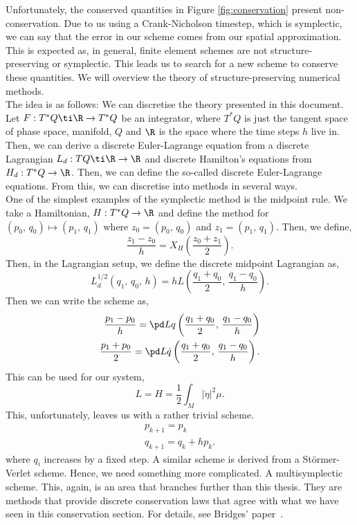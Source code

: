 \newpage
\noindent
Unfortunately, the conserved quantities in Figure \ref{fig:conservation} present non-conservation. Due to us using a Crank-Nicholson timestep, which is symplectic, we can say that the error in our scheme comes from our spatial approximation. This is expected as, in general, finite element schemes are not structure-preserving or symplectic. This leads us to search for a new scheme to conserve these quantities. We will overview the theory of structure-preserving numerical methods. \\

\noindent
The idea is as follows: We can discretise the theory presented in this document. Let $F : T^*Q \ti \R \to T^*Q$ be an integrator, where $T^*Q$ is just the tangent space of phase space, manifold, $Q$ and $\R$ is the space where the time steps $h$ live in. Then, we can derive a discrete Euler-Lagrange equation from a discrete Lagrangian $L_d : TQ \ti \R \to \R$ and discrete Hamilton's equations from $H_d : T^*Q\to \R$. Then, we can define the so-called discrete Euler-Lagrange equations. From this, we can discretise into methods in several ways.\\

\noindent
One of the simplest examples of the symplectic method is the midpoint rule. We take a Hamiltonian, $H : T^*Q \to \R$ and define the method for $(p_0,\,q_0) \mapsto (p_1,\,q_1)$ where $z_0 = (p_0,\,q_0)$ and $z_1 = (p_1,\,q_1)$. Then, we define,
$$ \frac{z_1-z_0}{h} = X_H \left( \frac{z_0 + z_1}{2} \right). $$
Then, in the Lagrangian setup, we define the discrete midpoint Lagrangian as,
$$ L_d^{1/2} (q_1,\,q_0,\, h) = hL\left(\frac{q_1 + q_0}{2},\, \frac{q_1 - q_0}{h}\right). $$
Then we can write the scheme as,
\begin{align*}
  \frac{p_1 - p_0}{h} = \pd L {q} \left(\frac{q_1 + q_0}{2},\, \frac{q_1 - q_0}{h}\right) \\
  \frac{p_1 + p_0}{2} = \pd L {\dot q}\left(\frac{q_1 + q_0}{2},\, \frac{q_1 - q_0}{h}\right).
\end{align*}
\noindent
This can be used for our system,
$$ L = H = \frac{1}{2}\int_M |\dot \eta|^2 \mu. $$
This, unfortunately, leaves us with a rather trivial scheme.
\begin{align*}
  p_{k+1} = p_k \\
  q_{k+1} = q_k + hp_k.
\end{align*}
where $q_i$ increases by a fixed step. A similar scheme is derived from a St\"ormer-Verlet scheme. Hence, we need something more complicated. A multisymplectic scheme. This, again, is an area that branches further than this thesis. They are methods that provide discrete conservation laws that agree with what we have seen in this conservation section. For details, see Bridges' paper~\cite{hamil_pdes}.

